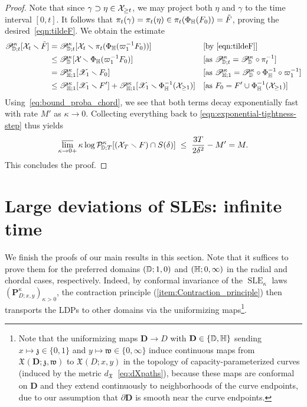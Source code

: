 \documentclass[a4paper, 11pt]{article}
\theoremstyle{definition}
\numberwithin{equation}{section}
\numberwithin{figure}{section}
\renewcommand{\limsup}{\varlimsup}
\newcommand{\SLE}[1][]{\operatorname{SLE}_{#1}}
\newcommand{\prDpaths}[1]{\pi_{#1}}
\newcommand{\prHpaths}[1]{\varpi_{#1}}
\newcommand{\Dpaths}[1][]{\cX_{#1}}
\newcommand{\Hpaths}[1][]{\mathscr{X}_{#1}} %
\newcommand{\Xpaths}[1][]{\mathfrak{X}_{#1}}
\newcommand{\dXpaths}[1][]{d_{\Xpaths[#1]}}
\newcommand{\Ddomain}{\mathbf{D}}
\newcommand{\targetpoint}{\mathfrak{w}}
\newcommand{\beginpoint}{\mathfrak{z}}
\newcommand{\cDmeas}[1]{\mathscr{P}^{#1}_{\!\bD}}
\newcommand{\rDmeasure}[2][]{\mathcal{P}^{#2}_{\!\bD;#1}}
\newcommand{\cHmeasure}[2][]{\mathscr{P}^{#2}_{\!\bH;#1}}
\newcommand{\cDmeasure}[2][]{\mathscr{P}^{#2}_{\!\bD;#1}}
\newcommand{\SLEmeasure}[2]{\mathbf{P}^{#2}_{\!\!#1}}
\begin{document}
\begin{proof}
Note that since $\gamma \supset \eta \in \Dpaths[\ge t]$, we may project both $\eta$ and $\gamma$ to the time interval $[0,t]$. 
It follows that 
$\prDpaths{t}(\gamma) = \prDpaths{t}(\eta) \in \prDpaths{t}(\Phi_\bH(F_0)) = \tilde F$, proving the desired~\eqref{eqn:tildeF}.
We obtain the estimate
\begin{align*}
	\cDmeasure[t]{\kappa}[\Dpaths[t]\smallsetminus \tilde \compact]
	=\;&  \cDmeasure[t]{\kappa}[\Dpaths[t] \smallsetminus \prDpaths{t}(\Phi_\bH(\prHpaths{1}^{-1} \compact_0))] 
	&& \textnormal{[by~\eqref{eqn:tildeF}]}
	\\
	\le\;& \cDmeas{\kappa}[\Dpaths \smallsetminus \Phi_\bH(\prHpaths{1}^{-1}\compact_0)] 
	&& \textnormal{[as $\cDmeasure[t]{\kappa} = \cDmeas{\kappa}\circ \prDpaths{t}^{-1}$]}
	\\
	=\;& \cHmeasure[1]{\kappa}[\Hpaths[1] \smallsetminus F_0] 
	&& \textnormal{[as $\cHmeasure[1]{\kappa} = \cDmeas{\kappa}\circ \Phi_\bH^{-1} \circ \prHpaths{1}^{-1}$]}
	\\
	\le\;& \cHmeasure[1]{\kappa}[\Hpaths[1] \smallsetminus F'] + \cHmeasure[1]{\kappa}[\Hpaths[1] \smallsetminus \Phi_\bH^{-1}(\Dpaths[\ge 1])] 
	&& \textnormal{[as $\compact_0 = \compact' \cup \Phi_\bH^{-1}(\Dpaths[\ge 1])$]}
\end{align*}
Using~\eqref{eq:bound_proba_chord}, we see that both terms decay exponentially fast with rate $M'$ as $\kappa \to 0$. 
Collecting everything back to \eqref{eqn:exponential-tightness-step} thus yields
\begin{align*}
\limsup_{\kappa \to 0+}\kappa\log \rDmeasure[T]{\kappa}[(\Dpaths[T] \smallsetminus \compact) \cap S(\delta)] 
\; \le \;  \frac{3T}{2\delta^2} - M' = M .
\end{align*}
This concludes the proof.
\end{proof}

\section{Large deviations of SLEs: infinite time} 
\label{sec:LDP-infinite-time}
We finish the proofs of our main results in this section. 
Note that it suffices to prove them for 
the preferred domains $(\mathbb{D};1,0)$ and $(\mathbb{H};0,\infty)$ in the radial and chordal cases, respectively.
Indeed, by conformal invariance of the $\SLE[\kappa]$ laws $(\SLEmeasure{D;x,y}{\kappa})_{\kappa > 0}$, 
the contraction principle (\ref{item:Contraction_principle}) 
then transports the LDPs to other domains via the uniformizing maps\footnote{Note that the uniformizing maps $\Ddomain \to D$ with $\Ddomain \in \{\bD, \bH\}$ sending 
$x \mapsto \beginpoint \in \{0, 1\}$ and $y \mapsto \targetpoint \in \{0, \infty\}$
induce continuous maps from $\Xpaths(\Ddomain;\beginpoint,\targetpoint)$ to $\Xpaths(D;x,y)$ 
in the topology of capacity-parameterized curves (induced by the metric $\dXpaths$~\eqref{eq:dXpaths}), 
because these maps are conformal on $\Ddomain$ and they extend continuously to neighborhoods of the curve endpoints, 
due to our assumption that $\partial \Ddomain$ is smooth near the curve endpoints.}.
\end{document}
